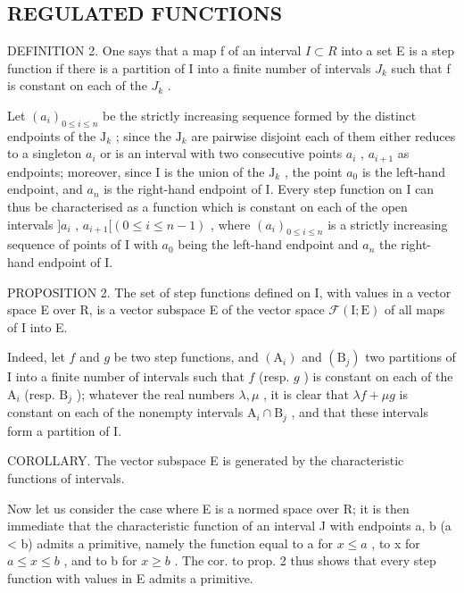 \subsection{REGULATED FUNCTIONS}

DEFINITION 2. One says that a map f of an interval \(I \subset R\) into a set E is a step function if there is a partition of I into a finite number of intervals \(J_{k}\) such that f is constant on each of the \(J_{k}\) .

Let \((a_{i})_{0\leqslant i\leqslant n}\) be the strictly increasing sequence formed by the distinct endpoints of the \(\mathrm{J}_k\) ; since the \(\mathrm{J}_k\) are pairwise disjoint each of them either reduces to a singleton \(a_{i}\) or is an interval with two consecutive points \(a_{i}\) , \(a_{i + 1}\) as endpoints; moreover, since I is the union of the \(\mathrm{J}_k\) , the point \(a_0\) is the left-hand endpoint, and \(a_{n}\) is the right-hand endpoint of I. Every step function on I can thus be characterised as a function which is constant on each of the open intervals \(]a_{i}\) , \(a_{i+1}[ (0 \leqslant i \leqslant n-1)\) , where \((a_{i})_{0 \leqslant i \leqslant n}\) is a strictly increasing sequence of points of I with \(a_{0}\) being the left-hand endpoint and \(a_{n}\) the right-hand endpoint of I.

PROPOSITION 2. The set of step functions defined on I, with values in a vector space E over R, is a vector subspace E of the vector space \(\mathcal{F}(\mathrm{I};\mathrm{E})\) of all maps of I into E.

Indeed, let \(f\) and \(g\) be two step functions, and \((\mathrm{A}_i)\) and \((\mathrm{B}_j)\) two partitions of I into a finite number of intervals such that \(f\) (resp. \(g\) ) is constant on each of the \(\mathrm{A}_i\) (resp. \(\mathrm{B}_j\) ); whatever the real numbers \(\lambda, \mu\) , it is clear that \(\lambda f + \mu g\) is constant on each of the nonempty intervals \(\mathrm{A}_i \cap \mathrm{B}_j\) , and that these intervals form a partition of I.

COROLLARY. The vector subspace E is generated by the characteristic functions of intervals.

Now let us consider the case where E is a normed space over R; it is then immediate that the characteristic function of an interval J with endpoints a, b (a \textless{} b) admits a primitive, namely the function equal to a for \(x \leqslant a\) , to x for \(a \leqslant x \leqslant b\) , and to b for \(x \geqslant b\) . The cor. to prop. 2 thus shows that every step function with values in E admits a primitive.

